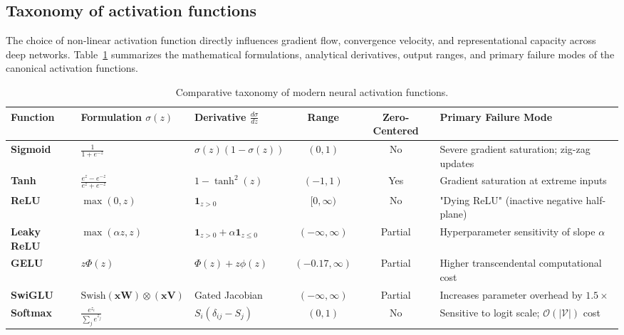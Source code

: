 \documentclass[../../../main.tex]{subfiles}
\begin{document}
\subsection{Taxonomy of activation functions}
\label{subsec:activation_taxonomy}

The choice of non-linear activation function directly influences gradient flow, convergence velocity, and representational capacity across deep networks. Table~\ref{tab:activation_comparison} summarizes the mathematical formulations, analytical derivatives, output ranges, and primary failure modes of the canonical activation functions.

\begin{table}[htbp]
\centering
\small
\renewcommand{\arraystretch}{1.3}
\caption{Comparative taxonomy of modern neural activation functions.}
\label{tab:activation_comparison}
\begin{tabularx}{\textwidth}{l l l c c X}
\toprule
\textbf{Function} & \textbf{Formulation $\sigma(z)$} & \textbf{Derivative $\frac{d\sigma}{dz}$} & \textbf{Range} & \textbf{Zero-Centered} & \textbf{Primary Failure Mode} \\
\midrule
\textbf{Sigmoid} & $\frac{1}{1 + e^{-z}}$ & $\sigma(z)(1 - \sigma(z))$ & $(0, 1)$ & No & Severe gradient saturation; zig-zag updates \\
\textbf{Tanh} & $\frac{e^z - e^{-z}}{e^z + e^{-z}}$ & $1 - \tanh^2(z)$ & $(-1, 1)$ & Yes & Gradient saturation at extreme inputs \\
\textbf{ReLU} & $\max(0, z)$ & $\mathbf{1}_{z > 0}$ & $[0, \infty)$ & No & "Dying ReLU" (inactive negative half-plane) \\
\textbf{Leaky ReLU} & $\max(\alpha z, z)$ & $\mathbf{1}_{z > 0} + \alpha \mathbf{1}_{z \le 0}$ & $(-\infty, \infty)$ & Partial & Hyperparameter sensitivity of slope $\alpha$ \\
\textbf{GELU} & $z \Phi(z)$ & $\Phi(z) + z \phi(z)$ & $(-0.17, \infty)$ & Partial & Higher transcendental computational cost \\
\textbf{SwiGLU} & $\text{Swish}(\mathbf{x}\mathbf{W}) \otimes (\mathbf{x}\mathbf{V})$ & Gated Jacobian & $(-\infty, \infty)$ & Partial & Increases parameter overhead by $1.5\times$ \\
\textbf{Softmax} & $\frac{e^{z_i}}{\sum_j e^{z_j}}$ & $S_i(\delta_{ij} - S_j)$ & $(0, 1)$ & No & Sensitive to logit scale; $\mathcal{O}(|\mathcal{V}|)$ cost \\
\bottomrule
\end{tabularx}
\end{table}
\end{document}
